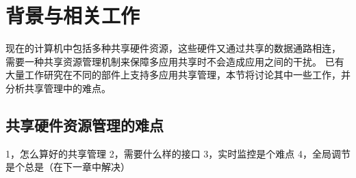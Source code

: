 \section{背景与相关工作}

现在的计算机中包括多种共享硬件资源，这些硬件又通过共享的数据通路相连，
需要一种共享资源管理机制来保障多应用共享时不会造成应用之间的干扰。
已有大量工作研究在不同的部件上支持多应用共享管理，本节将讨论其中一些工作，并分析共享管理中的难点。


\subsection{共享硬件资源管理的难点}
1，怎么算好的共享管理
2，需要什么样的接口
3，实时监控是个难点
4，全局调节是个总是（在下一章中解决）


\fi
